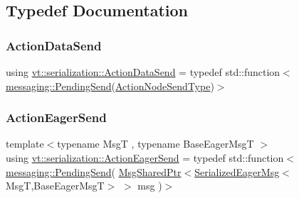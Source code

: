 \subsection{Typedef Documentation}
\mbox{\label{namespacevt_1_1serialization_afffcac0da80b78e77ef8043dba4e814f}} 
\subsubsection{\texorpdfstring{Action\+Data\+Send}{ActionDataSend}}
{\footnotesize\ttfamily using \hyperlink{namespacevt_1_1serialization_afffcac0da80b78e77ef8043dba4e814f}{vt\+::serialization\+::\+Action\+Data\+Send} = typedef std\+::function$<$\hyperlink{structvt_1_1messaging_1_1_pending_send}{messaging\+::\+Pending\+Send}(\hyperlink{namespacevt_1_1serialization_ad4f189ca4817d31b73436c92bca55deb}{Action\+Node\+Send\+Type})$>$}

\mbox{\label{namespacevt_1_1serialization_a009aa1de8d42a3c97643b947fcc6f0b6}} 
\subsubsection{\texorpdfstring{Action\+Eager\+Send}{ActionEagerSend}}
{\footnotesize\ttfamily template$<$typename MsgT , typename Base\+Eager\+MsgT $>$ \\
using \hyperlink{namespacevt_1_1serialization_a009aa1de8d42a3c97643b947fcc6f0b6}{vt\+::serialization\+::\+Action\+Eager\+Send} = typedef std\+::function$<$\hyperlink{structvt_1_1messaging_1_1_pending_send}{messaging\+::\+Pending\+Send}( \hyperlink{namespacevt_ab2b3d506ec8e8d1540aede826d84a239}{Msg\+Shared\+Ptr}$<$\hyperlink{namespacevt_1_1serialization_ac8b37425f8316a800cdb0b0f0f8a6438}{Serialized\+Eager\+Msg}$<$MsgT,Base\+Eager\+MsgT$>$ $>$ msg )$>$}

\mbox{\label{namespacevt_1_1serialization_ad4f189ca4817d31b73436c92bca55deb}} 
